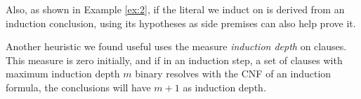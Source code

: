 Also, as shown in Example \ref{ex:2}, if the literal we induct on is derived from an induction conclusion, using its hypotheses as side premises can also help prove it.

Another heuristic we found useful uses the measure \textit{induction depth} on clauses. This measure is zero initially, and if in an induction step, a set of clauses with maximum induction depth $m$ binary resolves with the CNF of an induction formula, the conclusions will have $m+1$ as induction depth.
